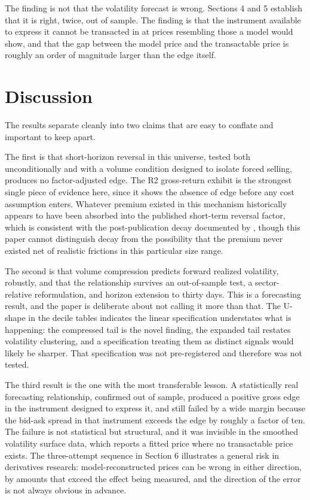 \documentclass[11pt]{article}
\begin{document}
The finding is not that the volatility forecast is wrong. Sections 4 and 5 establish that it is right, twice, out of sample. The finding is that the instrument available to express it cannot be transacted in at prices resembling those a model would show, and that the gap between the model price and the transactable price is roughly an order of magnitude larger than the edge itself.
\section{Discussion}

The results separate cleanly into two claims that are easy to conflate and important to keep apart.

The first is that short-horizon reversal in this universe, tested both unconditionally and with a volume condition designed to isolate forced selling, produces no factor-adjusted edge. The R2 gross-return exhibit is the strongest single piece of evidence here, since it shows the absence of edge before any cost assumption enters. Whatever premium existed in this mechanism historically appears to have been absorbed into the published short-term reversal factor, which is consistent with the post-publication decay documented by \citet{mcleanpontiff2016}, though this paper cannot distinguish decay from the possibility that the premium never existed net of realistic frictions in this particular size range.

The second is that volume compression predicts forward realized volatility, robustly, and that the relationship survives an out-of-sample test, a sector-relative reformulation, and horizon extension to thirty days. This is a forecasting result, and the paper is deliberate about not calling it more than that. The U-shape in the decile tables indicates the linear specification understates what is happening: the compressed tail is the novel finding, the expanded tail restates volatility clustering, and a specification treating them as distinct signals would likely be sharper. That specification was not pre-registered and therefore was not tested.

The third result is the one with the most transferable lesson. A statistically real forecasting relationship, confirmed out of sample, produced a positive gross edge in the instrument designed to express it, and still failed by a wide margin because the bid-ask spread in that instrument exceeds the edge by roughly a factor of ten. The failure is not statistical but structural, and it was invisible in the smoothed volatility surface data, which reports a fitted price where no transactable price exists. The three-attempt sequence in Section 6 illustrates a general risk in derivatives research: model-reconstructed prices can be wrong in either direction, by amounts that exceed the effect being measured, and the direction of the error is not always obvious in advance.
\end{document}
